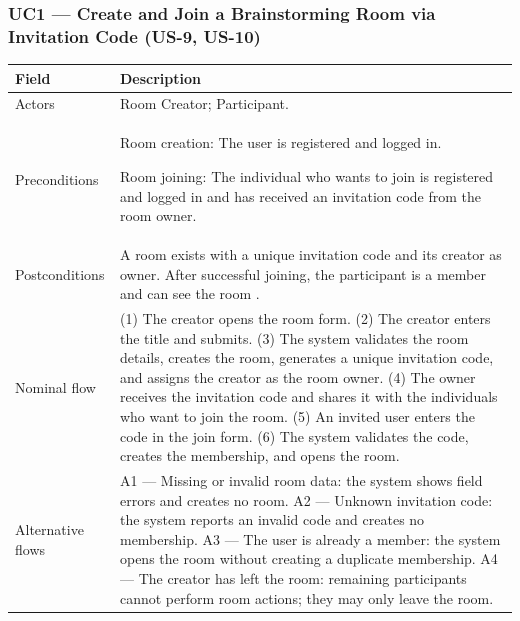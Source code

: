 \documentclass[12pt,a4paper]{report}
\begin{document}
\subsubsection{UC1 --- Create and Join a Brainstorming Room via Invitation Code (US-9, US-10)}
\begin{tabularx}{\textwidth}{|p{}|Y|}\hline
\textbf{Field} & \textbf{Description} \\\hline
Actors & Room Creator; Participant. \\\hline
Preconditions &Room creation: The user is registered and logged in.

Room joining: The individual who wants to join is registered and logged in and has received an invitation code from the room owner. \\\hline
Postconditions & A room exists with a unique invitation code and its creator as owner. After successful joining, the participant is a member and can see the room . \\\hline
Nominal flow & (1) The creator opens the room form. (2) The creator enters the title and submits. (3) The system validates the room details, creates the room, generates a unique invitation code, and assigns the creator as the room owner. (4) The owner receives the invitation code and shares it with the individuals who want to join the room. (5) An invited user enters the code in the join form. (6) The system validates the code, creates the membership, and opens the room. \\\hline
Alternative flows & A1 --- Missing or invalid room data: the system shows field errors and creates no room. A2 --- Unknown invitation code: the system reports an invalid code and creates no membership. A3 --- The user is already a member: the system opens the room without creating a duplicate membership. A4 --- The creator has left the room: remaining participants cannot perform room actions; they may only leave the room. \\\hline
\end{tabularx}
\end{document}
